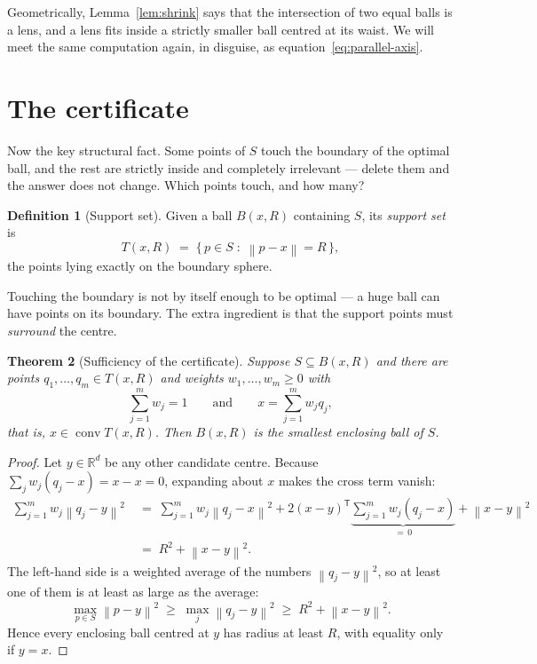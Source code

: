 \documentclass[11pt,a4paper]{article}
\theoremstyle{plain}
\newtheorem{theorem}{Theorem}[section]
\theoremstyle{definition}
\newtheorem{definition}[theorem]{Definition}
\theoremstyle{remark}
\DeclareMathOperator{\conv}{conv}
\newcommand{\R}{\mathbb{R}}
\newcommand{\norm}[1]{\left\lVert #1 \right\rVert}
\newcommand{\transpose}{^{\mathsf{T}}}
\begin{document}
Geometrically, Lemma~\ref{lem:shrink} says that the intersection of two equal
balls is a lens, and a lens fits inside a strictly smaller ball centred at its
waist. We will meet the same computation again, in disguise, as
equation~\eqref{eq:parallel-axis}.

\section{The certificate}
\label{sec:certificate}

Now the key structural fact. Some points of $S$ touch the boundary of the optimal
ball, and the rest are strictly inside and completely irrelevant --- delete them
and the answer does not change. Which points touch, and how many?

\begin{definition}[Support set]
  Given a ball $B(x,R)$ containing $S$, its \emph{support set} is
  \[
    T(x,R) \;=\; \{\, p\in S \;:\; \norm{p-x}=R \,\},
  \]
  the points lying exactly on the boundary sphere.
\end{definition}

Touching the boundary is not by itself enough to be optimal --- a huge ball can
have points on its boundary. The extra ingredient is that the support points must
\emph{surround} the centre.

\begin{theorem}[Sufficiency of the certificate]
  \label{thm:sufficient}
  Suppose $S\subseteq B(x,R)$ and there are points $q_1,\dots,q_m \in T(x,R)$ and
  weights $w_1,\dots,w_m \ge 0$ with
  \[
    \sum_{j=1}^m w_j = 1
    \qquad\text{and}\qquad
    x = \sum_{j=1}^m w_j q_j ,
  \]
  that is, $x\in\conv T(x,R)$. Then $B(x,R)$ is \emph{the} smallest enclosing
  ball of $S$.
\end{theorem}

\begin{proof}
  Let $y\in\R^d$ be any other candidate centre. Because
  $\sum_j w_j (q_j - x) = x - x = 0$, expanding about $x$ makes the cross term
  vanish:
  \begin{equation}
    \label{eq:parallel-axis}
    \begin{aligned}
      \sum_{j=1}^m w_j \norm{q_j - y}^2
        &\;=\; \sum_{j=1}^m w_j \norm{q_j - x}^2
            + 2 (x-y)\transpose \underbrace{\sum_{j=1}^m w_j (q_j-x)}_{=\,0}
            + \norm{x-y}^2 \\[0.3em]
        &\;=\; R^2 + \norm{x-y}^2 .
    \end{aligned}
  \end{equation}
  The left-hand side is a weighted average of the numbers $\norm{q_j-y}^2$, so at
  least one of them is at least as large as the average:
  \[
    \max_{p\in S}\norm{p-y}^2 \;\ge\; \max_j \norm{q_j-y}^2 \;\ge\; R^2 + \norm{x-y}^2 .
  \]
  Hence every enclosing ball centred at $y$ has radius at least $R$, with
  equality only if $y=x$.
\end{proof}
\end{document}
